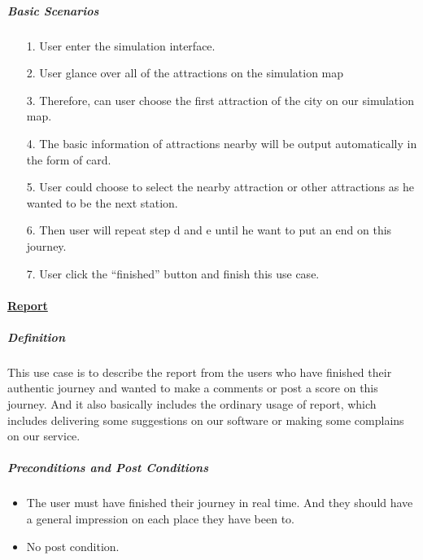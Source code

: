 \documentclass[10pt]{article}
\begin{document}
\begin{itemize}
		\subparagraph{Basic Scenarios} 
		\begin{itemize}
			\item[1.]	User enter the simulation interface.
			\item[2.]	User glance over all of the attractions on the simulation map
			\item[3.]	Therefore,  can user choose the first attraction of the city on our simulation map.
			\item[4.] The basic information of attractions nearby will be output automatically in the form of card.
			\item[5.]User could choose to select the nearby attraction or other attractions as he wanted to be the next station.
			\item[6.] Then user will repeat step d and e until he want to put an end on this journey.
			\item[7.]User click the “finished” button and finish this use case.
			
		\end{itemize}

		\paragraph{\underline{Report}}

		\subparagraph{Definition}
		This use case is to describe the report from the users who have finished their authentic journey and wanted to make a comments or post a score on this journey. And it also basically includes the ordinary usage of report, which includes delivering some suggestions on our software or making some complains on our service.

		\subparagraph{Preconditions and Post Conditions}
		\begin{itemize}
			\item The user must have finished their journey in real time. And they should have a general impression on each place they have been to. 
			\item No post condition.
		\end{itemize}


\end{itemize}
\end{document}
